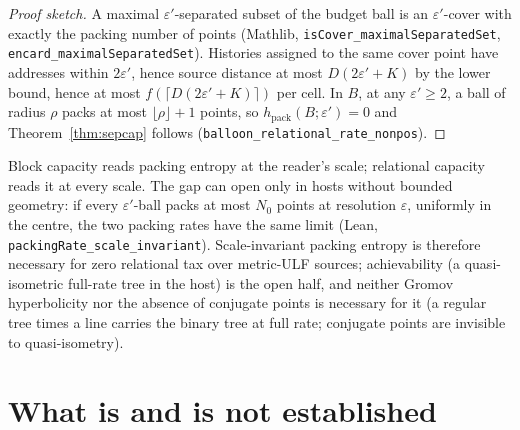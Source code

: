 \documentclass[11pt,a4paper]{article}
\theoremstyle{plain}
\theoremstyle{definition}
\theoremstyle{remark}
\newcommand{\hpack}{h_{\mathrm{pack}}}
\begin{document}
\begin{proof}[Proof sketch]
A maximal $\varepsilon'$-separated subset of the budget ball is an
$\varepsilon'$-cover with exactly the packing number of points (Mathlib,
\texttt{isCover\_\allowbreak{}maximalSeparatedSet}, \texttt{encard\_\allowbreak{}maximalSeparatedSet}).
Histories assigned to the same cover point have addresses within
$2\varepsilon'$, hence source distance at most $D(2\varepsilon'+K)$ by the
lower bound, hence at most $f(\lceil D(2\varepsilon'+K)\rceil)$ per cell.
In $B$, at any $\varepsilon'\ge2$, a ball of radius $\rho$ packs at most
$\lfloor\rho\rfloor+1$ points, so $\hpack(B;\varepsilon')=0$ and
Theorem~\ref{thm:sepcap} follows (\texttt{balloon\_\allowbreak{}relational\_\allowbreak{}rate\_\allowbreak{}nonpos}).
\end{proof}

Block capacity reads packing entropy at the reader's scale; relational
capacity reads it at every scale. The gap can open only in hosts without
bounded geometry: if every $\varepsilon'$-ball packs at most $N_0$ points at
resolution $\varepsilon$, uniformly in the centre, the two packing rates have
the same limit (Lean, \texttt{packingRate\_\allowbreak{}scale\_\allowbreak{}invariant}). Scale-invariant
packing entropy is therefore necessary for zero relational tax over
metric-ULF sources; achievability (a quasi-isometric full-rate tree in the
host) is the open half, and neither Gromov hyperbolicity nor the absence of
conjugate points is necessary for it (a regular tree times a line carries the
binary tree at full rate; conjugate points are invisible to quasi-isometry).

\section{What is and is not established}
\end{document}
